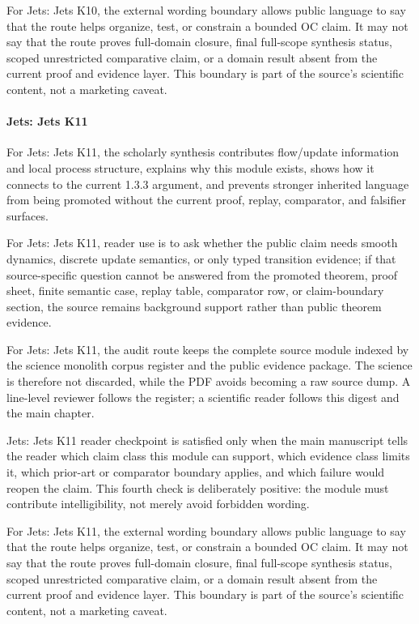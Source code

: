 For Jets: Jets K10, the external wording boundary allows public language to say that the route helps organize, test, or constrain a bounded OC claim. It may not say that the route proves full-domain closure, final full-scope synthesis status, scoped unrestricted comparative claim, or a domain result absent from the current proof and evidence layer. This boundary is part of the source's scientific content, not a marketing caveat.


\paragraph{Jets: Jets K11}

For Jets: Jets K11, the scholarly synthesis contributes flow/update information and local process structure, explains why this module exists, shows how it connects to the current 1.3.3 argument, and prevents stronger inherited language from being promoted without the current proof, replay, comparator, and falsifier surfaces.


For Jets: Jets K11, reader use is to ask whether the public claim needs smooth dynamics, discrete update semantics, or only typed transition evidence; if that source-specific question cannot be answered from the promoted theorem, proof sheet, finite semantic case, replay table, comparator row, or claim-boundary section, the source remains background support rather than public theorem evidence.


For Jets: Jets K11, the audit route keeps the complete source module indexed by the science monolith corpus register and the public evidence package. The science is therefore not discarded, while the PDF avoids becoming a raw source dump. A line-level reviewer follows the register; a scientific reader follows this digest and the main chapter.


Jets: Jets K11 reader checkpoint is satisfied only when the main manuscript tells the reader which claim class this module can support, which evidence class limits it, which prior-art or comparator boundary applies, and which failure would reopen the claim. This fourth check is deliberately positive: the module must contribute intelligibility, not merely avoid forbidden wording.


For Jets: Jets K11, the external wording boundary allows public language to say that the route helps organize, test, or constrain a bounded OC claim. It may not say that the route proves full-domain closure, final full-scope synthesis status, scoped unrestricted comparative claim, or a domain result absent from the current proof and evidence layer. This boundary is part of the source's scientific content, not a marketing caveat.


